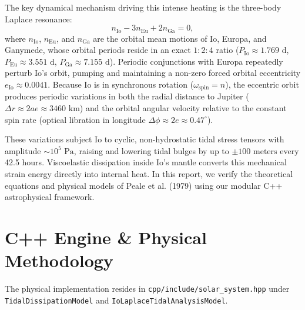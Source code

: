 \documentclass[11pt,a4paper]{article}
\begin{document}
The key dynamical mechanism driving this intense heating is the three-body Laplace resonance:
\begin{equation}
n_{\mathrm{Io}} - 3n_{\mathrm{Eu}} + 2n_{\mathrm{Ga}} = 0,
\end{equation}
where $n_{\mathrm{Io}}$, $n_{\mathrm{Eu}}$, and $n_{\mathrm{Ga}}$ are the orbital mean motions of Io, Europa, and Ganymede, whose orbital periods reside in an exact $1 : 2 : 4$ ratio ($P_{\mathrm{Io}} \approx 1.769\text{ d}$, $P_{\mathrm{Eu}} \approx 3.551\text{ d}$, $P_{\mathrm{Ga}} \approx 7.155\text{ d}$). Periodic conjunctions with Europa repeatedly perturb Io's orbit, pumping and maintaining a non-zero forced orbital eccentricity $e_{\mathrm{Io}} \approx 0.0041$. Because Io is in synchronous rotation ($\omega_{\mathrm{spin}} = n$), the eccentric orbit produces periodic variations in both the radial distance to Jupiter ($\Delta r \approx 2 a e \approx 3460\text{ km}$) and the orbital angular velocity relative to the constant spin rate (optical libration in longitude $\Delta \phi \approx 2 e \approx 0.47^\circ$).

These variations subject Io to cyclic, non-hydrostatic tidal stress tensors with amplitude $\sim 10^5\text{ Pa}$, raising and lowering tidal bulges by up to $\pm 100\text{ meters}$ every 42.5 hours. Viscoelastic dissipation inside Io's mantle converts this mechanical strain energy directly into internal heat. In this report, we verify the theoretical equations and physical models of Peale et al. (1979) using our modular C++ astrophysical framework.

\section{C++ Engine \& Physical Methodology}
The physical implementation resides in \texttt{cpp/include/solar\_system.hpp} under \texttt{TidalDissipationModel} and \texttt{IoLaplaceTidalAnalysisModel}.
\end{document}
